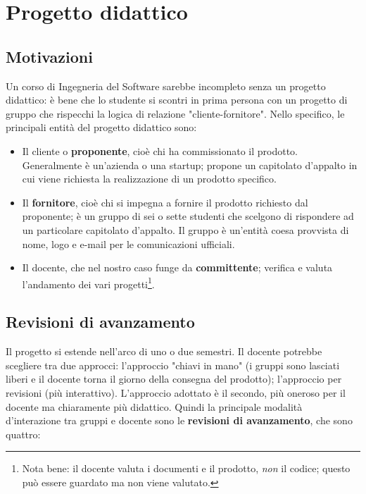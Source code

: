 \documentclass[a4paper]{article}
\begin{document}
	


		
	\section{Progetto didattico}


		
	\subsection{Motivazioni}

		
Un corso di Ingegneria del Software sarebbe incompleto senza un progetto didattico: è bene che lo studente si scontri in prima persona con un progetto di gruppo che rispecchi la logica di relazione "cliente-fornitore". Nello specifico, le principali entità del progetto didattico sono:
		
	\begin{itemize}
		
			
	\item Il cliente o \textbf{proponente}, cioè chi ha commissionato il prodotto. Generalmente è un'azienda o una startup; propone un capitolato d'appalto in cui viene richiesta la realizzazione di un prodotto specifico.
			
	\item Il \textbf{fornitore}, cioè chi si impegna a fornire il prodotto richiesto dal proponente; è un gruppo di sei o sette studenti che scelgono di rispondere ad un particolare capitolato d'appalto. Il gruppo è un'entità coesa provvista di nome, logo e e-mail per le comunicazioni ufficiali.
			
	\item Il docente, che nel nostro caso funge da \textbf{committente}; verifica e valuta l'andamento dei vari progetti\footnote{Nota bene: il docente valuta i documenti e il prodotto, \emph{non} il codice; questo può essere guardato ma non viene valutato.}.
		
	\end{itemize}


		
	\subsection{Revisioni di avanzamento}

		
Il progetto si estende nell'arco di uno o due semestri. Il docente potrebbe scegliere tra due approcci: l'approccio "chiavi in mano" (i gruppi sono lasciati liberi e il docente torna il giorno della consegna del prodotto); l'approccio per revisioni (più interattivo). L'approccio adottato è il secondo, più oneroso per il docente ma chiaramente più didattico. Quindi la principale modalità d'interazione tra gruppi e docente sono le \textbf{revisioni di avanzamento}, che sono quattro:
		
\end{document}
